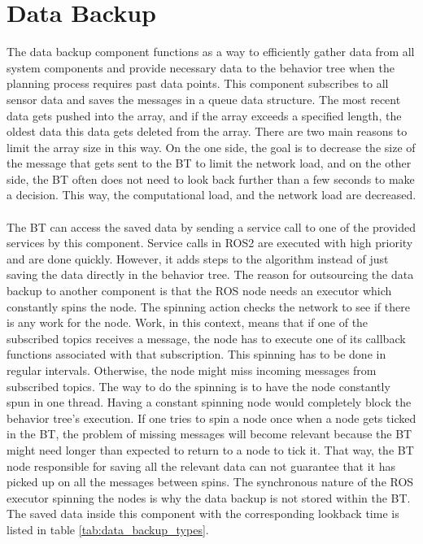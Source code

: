 \section{Data Backup}
The data backup component functions as a way to efficiently gather data from all system components and provide necessary data to the behavior tree when the planning process requires past data points. This component subscribes to all sensor data and saves the messages in a queue data structure. The most recent data gets pushed into the array, and if the array exceeds a specified length, the oldest data this data gets deleted from the array. There are two main reasons to limit the array size in this way. On the one side, the goal is to decrease the size of the message that gets sent to the BT to limit the network load, and on the other side, the BT often does not need to look back further than a few seconds to make a decision. This way, the computational load, and the network load are decreased.
\paragraph*{}

The BT can access the saved data by sending a service call to one of the provided services by this component. Service calls in ROS2 are executed with high priority and are done quickly. However, it adds steps to the algorithm instead of just saving the data directly in the behavior tree. The reason for outsourcing the data backup to another component is that the ROS node needs an executor which constantly spins the node. The spinning action checks the network to see if there is any work for the node. Work, in this context, means that if one of the subscribed topics receives a message, the node has to execute one of its callback functions associated with that subscription. This spinning has to be done in regular intervals. Otherwise, the node might miss incoming messages from subscribed topics. The way to do the spinning is to have the node constantly spun in one thread. Having a constant spinning node would completely block the behavior tree's execution. If one tries to spin a node once when a node gets ticked in the BT, the problem of missing messages will become relevant because the BT might need longer than expected to return to a node to tick it. That way, the BT node responsible for saving all the relevant data can not guarantee that it has picked up on all the messages between spins. The synchronous nature of the ROS executor spinning the nodes is why the data backup is not stored within the BT. 
The saved data inside this component with the corresponding lookback time is listed in table \ref{tab:data_backup_types}. 

